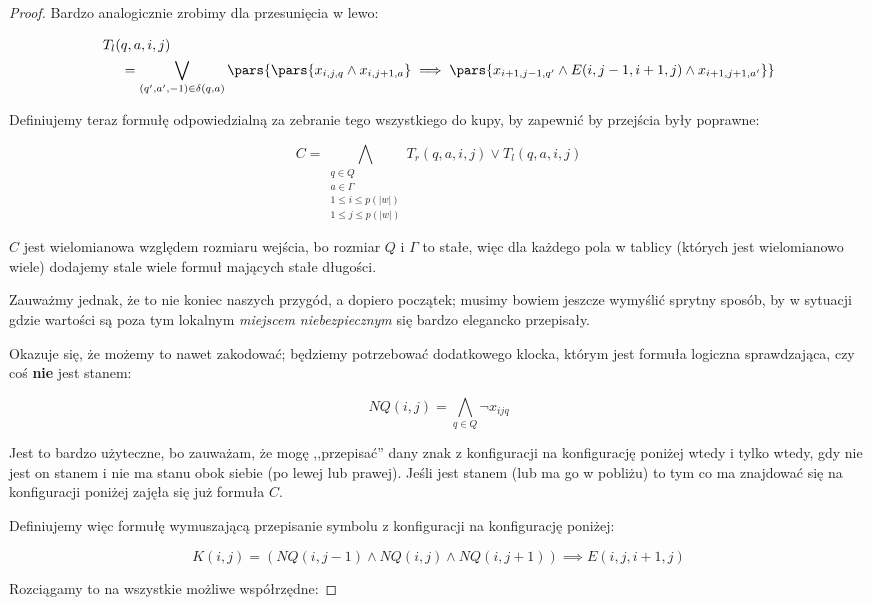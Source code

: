 \begin{proof}
	Bardzo analogicznie zrobimy dla przesunięcia w lewo:

	\[
		\begin{split}
			T_l( & q, a , i, j)                                                                                                                                                             \\
			     & = \bigvee_{(q', a', -1) \in \delta(q,a)} \pars{\pars{x_{i,j,q} \land x_{i, j + 1, a}} \implies \pars{x_{i+1, j-1, q'} \land E(i, j-1, i+1, j) \land x_{i + 1,j + 1,a'}}}
		\end{split}
	\]


	Definiujemy teraz formułę odpowiedzialną za zebranie tego wszystkiego do kupy, by zapewnić by przejścia były poprawne:

	\[
		C = \bigwedge_{\substack{q \in Q \\ a \in \Gamma \\ 1 \leq i \leq p(|w|) \\ 1 \leq j \leq p(|w|)}} T_r(q,a,i,j) \lor T_l(q,a,i,j)
	\]

	\(C\) jest wielomianowa względem rozmiaru wejścia, bo rozmiar \(Q\) i \(\Gamma\) to stałe, więc dla każdego pola w tablicy (których jest wielomianowo wiele) dodajemy stale wiele formuł mających stałe długości.

	Zauważmy jednak, że to nie koniec naszych przygód, a dopiero początek; musimy bowiem jeszcze wymyślić sprytny sposób, by w sytuacji gdzie wartości są poza tym lokalnym \textit{miejscem niebezpiecznym} się bardzo elegancko przepisały.

	Okazuje się, że możemy to nawet zakodować; będziemy potrzebować dodatkowego klocka, którym jest formuła logiczna sprawdzająca, czy coś \textbf{nie} jest stanem:

	\[
		NQ(i,j) = \bigwedge_{q \in Q} \neg x_{ijq}
	\]

	Jest to bardzo użyteczne, bo zauważam, że mogę ,,przepisać'' dany znak z konfiguracji na konfigurację poniżej wtedy i tylko wtedy, gdy nie jest on stanem i nie ma stanu obok siebie (po lewej lub prawej). Jeśli jest stanem (lub ma go w pobliżu) to tym co ma znajdować się na konfiguracji poniżej zajęła się już formuła \(C\).

	Definiujemy więc formułę wymuszającą przepisanie symbolu z konfiguracji na konfigurację poniżej:

	\[
		K(i,j) = (NQ(i, j-1) \land NQ(i,j) \land NQ(i, j+1)) \implies E(i, j, i+1, j)
	\]

	Rozciągamy to na wszystkie możliwe współrzędne:


\end{proof}
